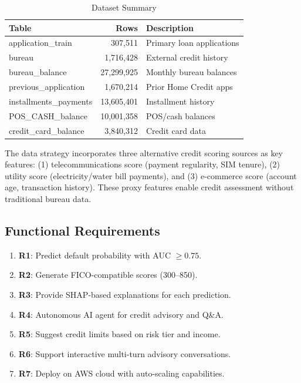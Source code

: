 \documentclass[12pt,a4paper]{article}
\begin{document}
\begin{table}[htbp]
\caption{Dataset Summary}
\label{tab:data}
\centering
\small
\begin{tabular}{lrl}
\toprule
\textbf{Table} & \textbf{Rows} & \textbf{Description} \\
\midrule
application\_train & 307,511 & Primary loan applications \\
bureau & 1,716,428 & External credit history \\
bureau\_balance & 27,299,925 & Monthly bureau balances \\
previous\_application & 1,670,214 & Prior Home Credit apps \\
installments\_payments & 13,605,401 & Installment history \\
POS\_CASH\_balance & 10,001,358 & POS/cash balances \\
credit\_card\_balance & 3,840,312 & Credit card data \\
\bottomrule
\end{tabular}
\end{table}

The data strategy incorporates three alternative credit scoring sources as key features: (1) telecommunications score (payment regularity, SIM tenure), (2) utility score (electricity/water bill payments), and (3) e-commerce score (account age, transaction history). These proxy features enable credit assessment without traditional bureau data.

\subsection{Functional Requirements}
\begin{enumerate}
    \item \textbf{R1}: Predict default probability with AUC $\geq 0.75$.
    \item \textbf{R2}: Generate FICO-compatible scores (300--850).
    \item \textbf{R3}: Provide SHAP-based explanations for each prediction.
    \item \textbf{R4}: Autonomous AI agent for credit advisory and Q\&A.
    \item \textbf{R5}: Suggest credit limits based on risk tier and income.
    \item \textbf{R6}: Support interactive multi-turn advisory conversations.
    \item \textbf{R7}: Deploy on AWS cloud with auto-scaling capabilities.
\end{enumerate}
\end{document}
